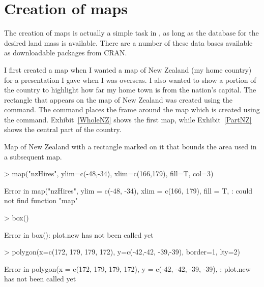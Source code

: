  
\section{Creation of maps} 
 
The creation of maps is actually a simple task in \R{}, as long as the database for the desired land mass is available. There are a number of these data bases available as downloadable packages from CRAN. 
 
I first created a map when I wanted a map of New Zealand (my home country) for a presentation I gave when I was overseas. I also wanted to show a portion of the country to highlight how far my home town is from the nation's capital. The rectangle that appears on the map of New Zealand was created using the  command. The  command places the frame around the map which is created using the  command. Exhibit~\ref{WholeNZ} shows the first map, while Exhibit~\ref{PartNZ} shows the central part of the country. 
\begin{exhibit} 
\caption{Map of New Zealand with a rectangle marked on it that bounds the area used in a subsequent map.} 
\label{WholeNZ} 
\begin{center} 

\begin{Schunk}
\begin{Sinput}
> map("nzHires", ylim=c(-48,-34), xlim=c(166,179), fill=T, col=3) 
\end{Sinput}
\begin{Soutput}
Error in map("nzHires", ylim = c(-48, -34), xlim = c(166, 179), fill = T, : could not find function "map"
\end{Soutput}
\begin{Sinput}
> box() 
\end{Sinput}
\begin{Soutput}
Error in box(): plot.new has not been called yet
\end{Soutput}
\begin{Sinput}
> polygon(x=c(172, 179, 179, 172), y=c(-42,-42, -39,-39), border=1, lty=2) 
\end{Sinput}
\begin{Soutput}
Error in polygon(x = c(172, 179, 179, 172), y = c(-42, -42, -39, -39), : plot.new has not been called yet
\end{Soutput}
\end{Schunk}

\end{center} 
\end{exhibit} 
 
